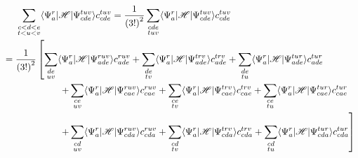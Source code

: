 \documentclass[a4paper]{book}
\begin{document}
	\begin{solution}
	
	\begin{align}
		&\hspace{1.4em}\sum_{ \substack{ c<d<e \\ t<u<v } } \langle \Psi^r_a | \mathscr{H} | \Psi^{tuv}_{cde} \rangle c^{tuv}_{cde} = \frac{1}{\left(3!\right)^2} \sum_{ \substack{ cde \\ tuv} } \langle \Psi^r_a | \mathscr{H} | \Psi^{tuv}_{cde} \rangle c^{tuv}_{cde} \notag \\
		&= \frac{1}{\left(3!\right)^2}  \left[ \sum_{ \substack{ de \\ uv } } \langle \Psi^r_a | \mathscr{H} | \Psi^{ruv}_{ade} \rangle c^{ruv}_{ade} + \sum_{ \substack{ de \\ tv } } \langle \Psi^r_a | \mathscr{H} | \Psi^{trv}_{ade} \rangle c^{trv}_{ade} + \sum_{ \substack{ de \\ tu } } \langle \Psi^r_a | \mathscr{H} | \Psi^{tur}_{ade} \rangle c^{tur}_{ade} \right. \notag \\
		&\hspace{ 6em } \left. + \sum_{ \substack{ ce \\ uv } } \langle \Psi^r_a | \mathscr{H} | \Psi^{ruv}_{cae} \rangle c^{ruv}_{cae} + \sum_{ \substack{ ce \\ tv } } \langle \Psi^r_a | \mathscr{H} | \Psi^{trv}_{cae} \rangle c^{trv}_{cae} + \sum_{ \substack{ ce \\ tu } } \langle \Psi^r_a | \mathscr{H} | \Psi^{tur}_{cae} \rangle c^{tur}_{cae} \right. \notag \\
		&\hspace{ 6em } \left. + \sum_{ \substack{ cd \\ uv } } \langle \Psi^r_a | \mathscr{H} | \Psi^{ruv}_{cda} \rangle c^{ruv}_{cda} + \sum_{ \substack{ cd \\ tv } } \langle \Psi^r_a | \mathscr{H} | \Psi^{trv}_{cda} \rangle c^{trv}_{cda} + \sum_{ \substack{ cd \\ tu } } \langle \Psi^r_a | \mathscr{H} | \Psi^{tur}_{cda} \rangle c^{tur}_{cda} \right] \notag \\

\end{align}
\end{solution}
\end{document}
